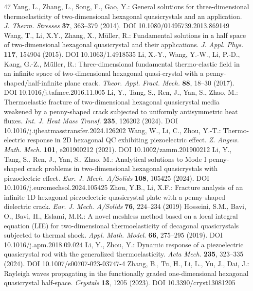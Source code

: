 \documentclass[11pt]{article}
\begin{document}
\begin{thebibliography}{47}
 Yang, L., Zhang, L., Song, F., Gao, Y.: General solutions for three-dimensional thermoelasticity of two-dimensional hexagonal quasicrystals and an application. \emph{J. Therm. Stresses} \textbf{37}, 363--379 (2014). DOI 10.1080/01495739.2013.869149
 Wang, T., Li, X.Y., Zhang, X., M\"uller, R.: Fundamental solutions in a half space of two-dimensional hexagonal quasicrystal and their applications. \emph{J. Appl. Phys.} \textbf{117}, 154904 (2015). DOI 10.1063/1.4918535
 Li, X.-Y., Wang, Y.-W., Li, P.-D., Kang, G.-Z., M\"uller, R.: Three-dimensional fundamental thermo-elastic field in an infinite space of two-dimensional hexagonal quasi-crystal with a penny-shaped/half-infinite plane crack. \emph{Theor. Appl. Fract. Mech.} \textbf{88}, 18--30 (2017). DOI 10.1016/j.tafmec.2016.11.005
 Li, Y., Tang, S., Ren, J., Yan, S., Zhao, M.: Thermoelastic fracture of two-dimensional hexagonal quasicrystal media weakened by a penny-shaped crack subjected to uniformly antisymmetric heat fluxes. \emph{Int. J. Heat Mass Transf.} \textbf{235}, 126202 (2024). DOI 10.1016/j.ijheatmasstransfer.2024.126202
 Wang, W., Li, C., Zhou, Y.-T.: Thermo-electric response in 2D hexagonal QC exhibiting piezoelectric effect. \emph{Z. Angew. Math. Mech.} \textbf{101}, e201900212 (2021). DOI 10.1002/zamm.201900212
 Li, Y., Tang, S., Ren, J., Yan, S., Zhao, M.: Analytical solutions to Mode I penny-shaped crack problems in two-dimensional hexagonal quasicrystals with piezoelectric effect. \emph{Eur. J. Mech. A/Solids} \textbf{108}, 105425 (2024). DOI 10.1016/j.euromechsol.2024.105425
 Zhou, Y.B., Li, X.F.: Fracture analysis of an infinite 1D hexagonal piezoelectric quasicrystal plate with a penny-shaped dielectric crack. \emph{Eur. J. Mech. A/Solids} \textbf{76}, 224--234 (2019)
 Hosseini, S.M., Bavi, O., Bavi, H., Eslami, M.R.: A novel meshless method based on a local integral equation (LIE) for two-dimensional thermoelasticity of decagonal quasicrystals subjected to thermal shock. \emph{Appl. Math. Model.} \textbf{66}, 275--295 (2019). DOI 10.1016/j.apm.2018.09.024
 Li, Y., Zhou, Y.: Dynamic response of a piezoelectric quasicrystal rod with the generalized thermoelasticity. \emph{Acta Mech.} \textbf{235}, 323--335 (2024). DOI 10.1007/s00707-023-03747-4
 Zhang, B., Tu, H., Li, L., Yu, J., Dai, J.: Rayleigh waves propagating in the functionally graded one-dimensional hexagonal quasicrystal half-space. \emph{Crystals} \textbf{13}, 1205 (2023). DOI 10.3390/cryst13081205

\end{thebibliography}
\end{document}
